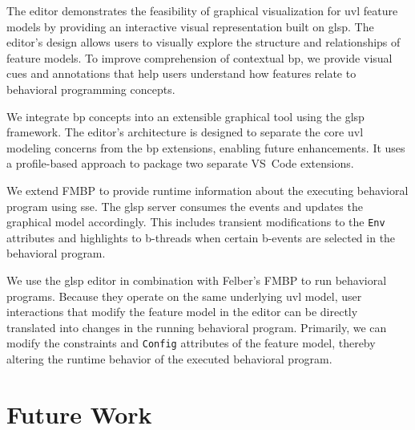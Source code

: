 \begin{description}[leftmargin=1.5cm, labelwidth=1.3cm, labelsep=0.2cm]
    \item[\textbf{RQ1:}]
    The editor demonstrates the feasibility of graphical visualization for \gls{uvl} feature models by providing an interactive visual representation built on \gls{glsp}.
    The editor's design allows users to visually explore the structure and relationships of feature models.
    To improve comprehension of contextual \gls{bp}, we provide visual cues and annotations that help users understand how features relate to behavioral programming concepts.
     
    \item[\textbf{RQ2:}]
    We integrate \gls{bp} concepts into an extensible graphical tool using the \gls{glsp} framework.
    The editor's architecture is designed to separate the core \gls{uvl} modeling concerns from the \gls{bp} extensions, enabling future enhancements.
    It uses a profile-based approach to package two separate VS~Code extensions.
    
    \item[\textbf{RQ3.1:}]
    We extend FMBP to provide runtime information about the executing behavioral program using \gls{sse}.
    The \gls{glsp} server consumes the events and updates the graphical model accordingly.
    This includes transient modifications to the \texttt{Env} attributes and highlights to b-threads when certain b-events are selected in the behavioral program.
    
    \item[\textbf{RQ3.2}]
    We use the \gls{glsp} editor in combination with Felber's FMBP to run behavioral programs.
    Because they operate on the same underlying \gls{uvl} model, user interactions that modify the feature model in the editor can be directly translated into changes in the running behavioral program.
    Primarily, we can modify the constraints and \texttt{Config} attributes of the feature model, thereby altering the runtime behavior of the executed behavioral program.
\end{description}

\section{Future Work}
\label{sec:conclusion_future_work}

